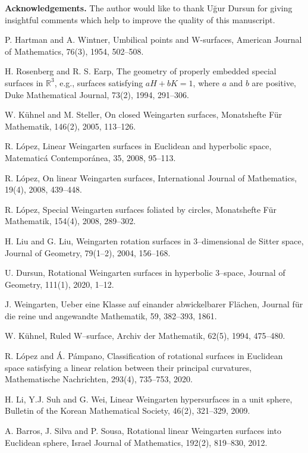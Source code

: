 \documentclass{amsart}
\theoremstyle{definition}
\numberwithin{equation}{section}
\begin{document}
\textbf{Acknowledgements.} The author would like to thank
U\u{g}ur Dursun for giving insightful comments which help to improve the quality of this manuscript.

\begin{thebibliography}{}
P. Hartman and A. Wintner, 
Umbilical points and W-surfaces, 
American Journal of Mathematics, 76(3), 1954, 502--508.

H. Rosenberg and R. S. Earp, 
The geometry of properly embedded special surfaces in $\mathbb{R}^3$, e.g., surfaces satisfying $aH+bK=1$,
where $a$ and $b$ are positive, 
Duke Mathematical Journal, 73(2), 1994, 291--306.

W. K\"{u}hnel and M. Steller, 
On closed Weingarten surfaces, 
Monatshefte F\"{u}r Mathematik, 146(2), 2005, 113--126.

R. L\'{o}pez, 
Linear Weingarten surfaces in Euclidean and hyperbolic space,
Matematic\'{a} Contempor\'{a}nea, 35, 2008, 95--113.

R. L\'{o}pez, 
On linear Weingarten surfaces, 
International Journal of Mathematics, 19(4), 2008, 439--448.

R. L\'{o}pez, 
Special Weingarten surfaces foliated by circles, 
Monatshefte F\"{u}r Mathematik, 154(4), 2008, 289--302.

H. Liu and G. Liu, 
Weingarten rotation surfaces in 3--dimensional de Sitter space, 
Journal of Geometry, 79(1--2), 2004, 156--168.

U. Dursun, 
Rotational Weingarten surfaces in hyperbolic 3--space, 
Journal of Geometry, 111(1), 2020, 1--12.

J. Weingarten, 
Ueber eine Klasse auf einander abwickelbarer Fl\"achen, 
Journal f\"{u}r die reine und angewandte Mathematik, 
59, 382--393, 1861.

W. K\"{u}hnel, 
Ruled W--surface, 
Archiv der Mathematik, 62(5), 1994, 475--480.

R. L\'{o}pez and \'{A}. P\'{a}mpano, 
Classification of rotational surfaces in Euclidean space 
satisfying a linear relation between their principal curvatures, 
Mathematische Nachrichten, 293(4), 735--753, 2020.

H. Li, Y.J. Suh and G. Wei, 
Linear Weingarten hypersurfaces in a unit sphere, 
Bulletin of the Korean Mathematical Society, 
46(2), 321--329, 2009.

A. Barros, J. Silva and P. Sousa, 
Rotational linear Weingarten surfaces into Euclidean sphere,
Israel Journal of Mathematics, 192(2), 819--830, 2012.


\end{thebibliography}
\end{document}
